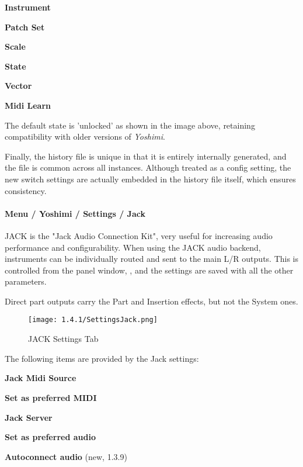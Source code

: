    \begin{enumber}
      \item \textbf{Instrument}
      \item \textbf{Patch Set}
      \item \textbf{Scale}
      \item \textbf{State}
      \item \textbf{Vector}
      \item \textbf{Midi Learn}
   \end{enumber}

   The default state is 'unlocked' as shown in the image above, retaining
   compatibility with older versions of \textsl{Yoshimi}.

   Finally, the history file is unique in that it is entirely internally
   generated, and the file is common across all instances. Although treated as
   a config setting, the new switch settings are actually embedded in the
   history file itself, which ensures consistency.


\paragraph{Menu / Yoshimi / Settings / Jack}
\label{paragraph:menu_yoshimi_settings_jack}

   JACK is the "Jack Audio Connection Kit", very useful for increasing audio
   performance and configurability.
   When using the JACK audio backend, instruments can be individually routed
   and sent to the main L/R outputs. This is controlled from the
   panel window,
   ,
   and the settings are saved with all the other parameters.

   Direct part outputs carry the Part and Insertion effects, but not the
   System ones.

\begin{figure}[H]
   \centering
   \texttt{[image: 1.4.1/SettingsJack.png]}
   \caption[JACK Settings]{JACK Settings Tab}
   \label{fig:yoshimi_settings_jack_tab}
\end{figure}

   The following items are provided by the Jack settings:

   \begin{enumber}
      \item \textbf{Jack Midi Source}
      \item \textbf{Set as preferred MIDI}
      \item \textbf{Jack Server}
      \item \textbf{Set as preferred audio}
      \item \textbf{Autoconnect audio} (new, 1.3.9)
   \end{enumber}

